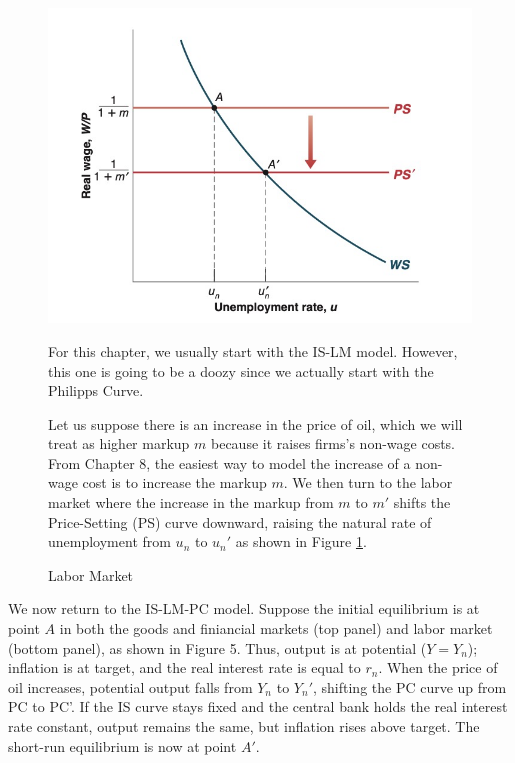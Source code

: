 \documentclass{extarticle}
\begin{document}
\begin{figure}[H] 
  \centering %
  \begin{minipage}{0.35\linewidth} 
    \centering 
    \includegraphics[width=\linewidth]{labor.png} 
    \caption{Labor Market} 
    \label{fig:labor} 
  \end{minipage}%
  \begin{minipage}{0.65\linewidth}
    For this chapter, we usually start with the IS-LM model. However, this one is going to be a doozy since we actually start with the Philipps Curve. 
    
    \vspace{2mm}
    
    Let us suppose there is an increase in the price of oil, which we will treat as higher markup $m$ because it raises firms’s non-wage costs. 
    From Chapter 8, the easiest way to model the increase of a non-wage cost is to increase the markup $m$. 
    We then turn to the labor market where the increase in the markup from $m$ to $m'$ shifts the Price-Setting (PS) curve downward, raising the natural rate of unemployment from $u_n$ to $u_n'$ as shown in Figure \ref{fig:labor}. 
  \end{minipage} 
\end{figure}


We now return to the IS-LM-PC model. Suppose the initial equilibrium is at point $A$ in both the goods and finiancial markets (top panel) and labor market (bottom panel), as shown in Figure 5. 
Thus, output is at potential ($Y = Y_n$); inflation is at target, and the real interest rate is equal to $r_n$. When the price of oil increases, potential output falls from $Y_n$ to $Y_n'$, shifting the PC curve up from PC to PC'. 
If the IS curve stays fixed and the central bank holds the real interest rate constant, output remains the same, but inflation rises above target. The short-run equilibrium is now at point $A'$.
\end{document}
